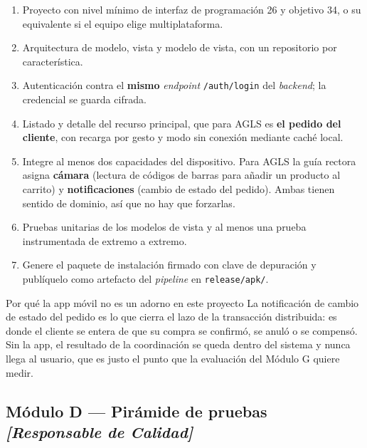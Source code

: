 \documentclass[11pt,a4paper]{article}
\begin{document}
\begin{enumerate}[leftmargin=*,itemsep=3pt]
	\item Proyecto con nivel mínimo de interfaz de programación 26 y objetivo 34, o su equivalente si el equipo elige multiplataforma.
	\item Arquitectura de modelo, vista y modelo de vista, con un repositorio por característica.
	\item Autenticación contra el \textbf{mismo} \emph{endpoint} \texttt{/auth/login} del \emph{backend}; la credencial se guarda cifrada.
	\item Listado y detalle del recurso principal, que para AGLS es \textbf{el pedido del cliente}, con recarga por gesto y modo sin conexión mediante caché local.
	\item Integre al menos dos capacidades del dispositivo. Para AGLS la guía rectora asigna \textbf{cámara} (lectura de códigos de barras para añadir un producto al carrito) y \textbf{notificaciones} (cambio de estado del pedido). Ambas tienen sentido de dominio, así que no hay que forzarlas.
	\item Pruebas unitarias de los modelos de vista y al menos una prueba instrumentada de extremo a extremo.
	\item Genere el paquete de instalación firmado con clave de depuración y publíquelo como artefacto del \emph{pipeline} en \texttt{release/apk/}.
\end{enumerate}

\begin{defBox}{Por qué la app móvil no es un adorno en este proyecto}
	La notificación de cambio de estado del pedido es lo que cierra el lazo de la transacción distribuida: es donde el cliente se entera de que su compra se confirmó, se anuló o se compensó. Sin la app, el resultado de la coordinación se queda dentro del sistema y nunca llega al usuario, que es justo el punto que la evaluación del Módulo G quiere medir.
\end{defBox}

\subsection{Módulo D --- Pirámide de pruebas \emph{[Responsable de Calidad]}}
\end{document}
